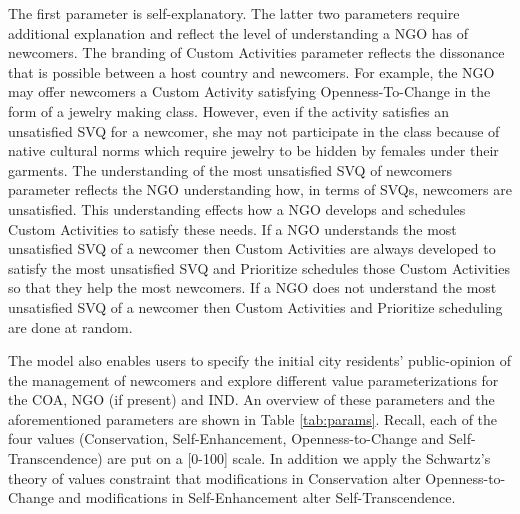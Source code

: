 \documentclass{scspaperproc}
\theoremstyle{scsthe}
\begin{document}
The first parameter is self-explanatory. The latter two parameters require additional explanation and reflect the level of understanding a NGO has of newcomers. The branding of Custom Activities parameter reflects the dissonance that is possible between a host country and newcomers. For example, the NGO may offer newcomers a Custom Activity satisfying Openness-To-Change in the form of a jewelry making class. However, even if the activity satisfies an unsatisfied SVQ for a newcomer, she may not participate in the class because of native cultural norms which require jewelry to be hidden by females under their garments. The understanding of the most unsatisfied SVQ of newcomers parameter reflects the NGO understanding how, in terms of SVQs, newcomers are unsatisfied. This understanding effects how a NGO develops and schedules Custom Activities to satisfy these needs. If a NGO understands the most unsatisfied SVQ of a newcomer then Custom Activities are always developed to satisfy the most unsatisfied SVQ and Prioritize schedules those Custom Activities so that they help the most newcomers. If a NGO does not understand the most unsatisfied SVQ of a newcomer then Custom Activities and Prioritize scheduling are done at random.

The model also enables users to specify the initial city residents' public-opinion of the management of newcomers and explore different value parameterizations for the COA, NGO (if present) and IND. An overview of these parameters and the aforementioned parameters are shown in Table \ref{tab:params}. Recall, each of the four values (Conservation, Self-Enhancement, Openness-to-Change and Self-Transcendence) are put on a [0-100] scale. In addition we apply the Schwartz's theory of values constraint that modifications in Conservation alter Openness-to-Change and modifications in Self-Enhancement alter Self-Transcendence.
\end{document}
